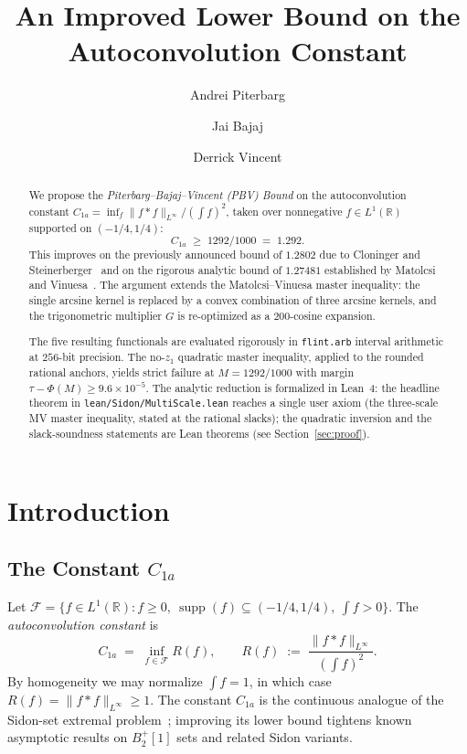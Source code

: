 \documentclass[11pt, letterpaper]{article}
\title{An Improved Lower Bound on the Autoconvolution Constant}
\author[]{Andrei Piterbarg}
\author[]{Jai Bajaj}
\author[]{Derrick Vincent}
\affil[]{University of Pennsylvania, Philadelphia, PA, USA}
\date{}
\theoremstyle{plain}
\theoremstyle{definition}
\newcommand{\R}{\mathbb{R}}
\newcommand{\Linf}{L^\infty}
\newcommand{\supp}{\operatorname{supp}}
\begin{document}
\maketitle

\begin{abstract}
We propose the \emph{Piterbarg--Bajaj--Vincent (PBV) Bound} on the
autoconvolution constant
$C_{1a}=\inf_f \|f*f\|_{\Linf}/(\int f)^2$, taken over nonnegative
$f\in L^1(\R)$ supported on $(-1/4,1/4)$:
\[
  C_{1a}\;\ge\;1292/1000\;=\;1.292.
\]
This improves on the previously announced bound of
$1.2802$ due to Cloninger and Steinerberger~\cite{CS17} and on the
rigorous analytic bound of $1.27481$ established by Matolcsi and
Vinuesa~\cite{MV10}.  The argument extends the Matolcsi--Vinuesa
master inequality: the single arcsine kernel is
replaced by a convex combination of three arcsine kernels, and the
trigonometric multiplier $G$ is re-optimized as a $200$-cosine
expansion.
\par\medskip
The five resulting functionals are evaluated rigorously in
\texttt{flint.arb} interval arithmetic at $256$-bit precision.  The
no-$z_1$ quadratic master inequality, applied to the rounded rational
anchors, yields strict failure at $M=1292/1000$ with margin
$\tau-\Phi(M)\ge 9.6\times 10^{-5}$.  The analytic reduction is
formalized in Lean~4: the headline theorem in
\texttt{lean/Sidon/MultiScale.lean} reaches a single user axiom
(the three-scale MV master inequality, stated at the rational slacks);
the quadratic inversion and the slack-soundness statements are Lean
theorems (see Section~\ref{sec:proof}).
\end{abstract}

\medskip

\section{Introduction}\label{sec:intro}

\subsection{The Constant \texorpdfstring{$C_{1a}$}{C1a}}\label{subsec:intro-constant}

Let $\mathcal{F}=\{f\in L^1(\R) : f\ge 0,\
\supp(f)\subseteq(-1/4,1/4),\ \int f>0\}$.  The
\emph{autoconvolution constant} is
\[
  C_{1a}
  \;=\;
  \inf_{f\in\mathcal{F}} R(f),
  \qquad
  R(f) \;:=\; \frac{\|f*f\|_{\Linf}}{\left(\int f\right)^2}.
\]
By homogeneity we may normalize $\int f=1$, in which case
$R(f)=\|f*f\|_{\Linf}\ge 1$.  The constant $C_{1a}$ is the continuous
analogue of the Sidon-set extremal problem~\cite{ET41,MO2009};
improving its lower bound tightens known asymptotic results on
$B_2^{+}[1]$ sets and related Sidon variants.
\end{document}
